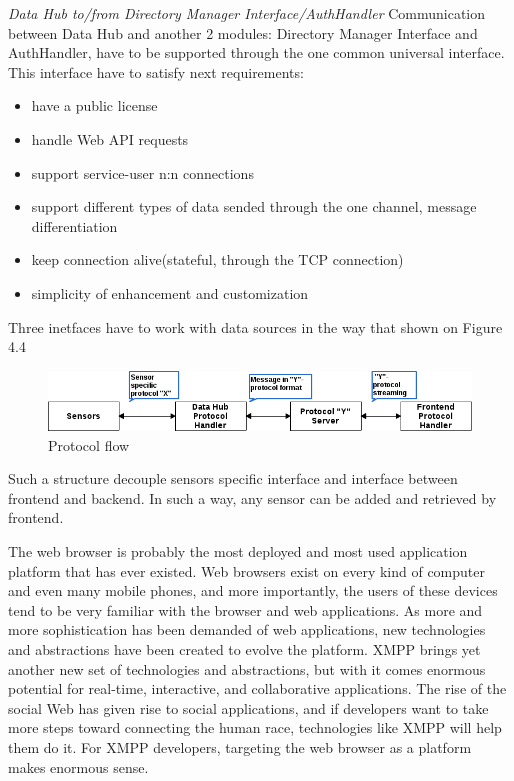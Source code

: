      \emph{Data Hub to/from Directory Manager Interface/AuthHandler}
      \newline
      Communication between Data Hub and another 2 modules: Directory Manager Interface and AuthHandler, have to be supported through the one common universal interface. This interface have to satisfy next requirements:
      \begin{itemize}
      \item have a public license
      \item handle Web API requests
      \item support service-user n:n connections
      \item support different types of data sended through the one channel, message differentiation
      \item keep connection alive(stateful, through the TCP connection)
      \item simplicity of enhancement and customization
      \end{itemize}

      Three inetfaces have to work with data sources in the way that shown on Figure 4.4

      \begin{figure}[!ht]
      \centering
      \includegraphics[scale=0.6]{images/Protocol_flow.png}   
      \caption[Protocol flow]{Protocol flow}
      \label{img:protocol}                           
      \end{figure}
      Such a structure decouple sensors specific interface and interface between frontend and backend. In such a way, any sensor can be added and retrieved by frontend. 
    
      The web browser is probably the most deployed and most used application platform that has ever existed. Web browsers exist on every kind of computer and even many mobile phones, and more importantly, the users of these devices tend to be very familiar with the browser and web applications. As more and more sophistication has been demanded of web applications, new technologies and abstractions have been created to evolve the platform. XMPP brings yet another new set of technologies and abstractions, but with it comes enormous potential for real-time, interactive, and collaborative applications. The rise of the social Web has given rise to social applications, and if developers want to take more steps toward connecting the human race, technologies like XMPP will help them do it. For XMPP developers, targeting the web browser as a platform makes enormous sense.

